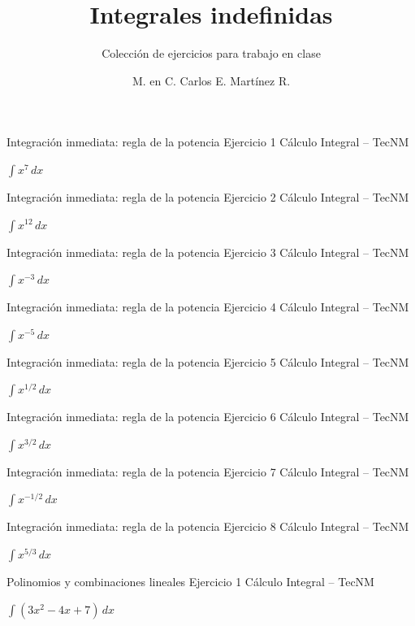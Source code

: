 \documentclass[aspectratio=169,12pt]{beamer}
\title{Integrales indefinidas}
\subtitle{Colección de ejercicios para trabajo en clase}
\author{M. en C. Carlos E. Martínez R.}\institute{Cálculo Integral \\ Tecnológico Nacional de México}
\date{}
\newcommand{\ejercicio}[1]{%
  \begin{center}
  \vfill
  {\fontsize{24}{30}\selectfont #1}
  \vfill
  \end{center}
}
\begin{document}
\begin{frame}[plain]
\titlepage
\end{frame}
\begin{frame}{Integración inmediata: regla de la potencia}
\small Ejercicio 1 \hfill Cálculo Integral -- TecNM
\ejercicio{$\displaystyle \int x^7\,dx$}
\end{frame}

\begin{frame}{Integración inmediata: regla de la potencia}
\small Ejercicio 2 \hfill Cálculo Integral -- TecNM
\ejercicio{$\displaystyle \int x^{12}\,dx$}
\end{frame}

\begin{frame}{Integración inmediata: regla de la potencia}
\small Ejercicio 3 \hfill Cálculo Integral -- TecNM
\ejercicio{$\displaystyle \int x^{-3}\,dx$}
\end{frame}

\begin{frame}{Integración inmediata: regla de la potencia}
\small Ejercicio 4 \hfill Cálculo Integral -- TecNM
\ejercicio{$\displaystyle \int x^{-5}\,dx$}
\end{frame}

\begin{frame}{Integración inmediata: regla de la potencia}
\small Ejercicio 5 \hfill Cálculo Integral -- TecNM
\ejercicio{$\displaystyle \int x^{1/2}\,dx$}
\end{frame}

\begin{frame}{Integración inmediata: regla de la potencia}
\small Ejercicio 6 \hfill Cálculo Integral -- TecNM
\ejercicio{$\displaystyle \int x^{3/2}\,dx$}
\end{frame}

\begin{frame}{Integración inmediata: regla de la potencia}
\small Ejercicio 7 \hfill Cálculo Integral -- TecNM
\ejercicio{$\displaystyle \int x^{-1/2}\,dx$}
\end{frame}

\begin{frame}{Integración inmediata: regla de la potencia}
\small Ejercicio 8 \hfill Cálculo Integral -- TecNM
\ejercicio{$\displaystyle \int x^{5/3}\,dx$}
\end{frame}

\begin{frame}{Polinomios y combinaciones lineales}
\small Ejercicio 1 \hfill Cálculo Integral -- TecNM
\ejercicio{$\displaystyle \int(3x^2-4x+7)\,dx$}
\end{frame}
\end{document}
